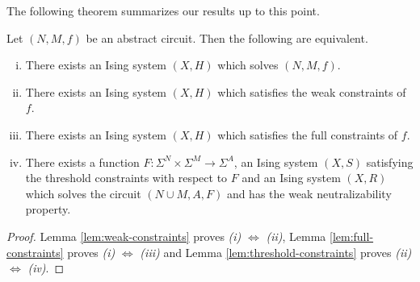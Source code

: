 \documentclass{article}
\begin{document}
\bigskip

The following theorem summarizes our results up to this point.
\begin{thm}\label{thm:ising-solve-equivalences}
  Let $(N, M, f)$ be an abstract circuit. Then the following are equivalent.
  \begin{enumerate}[(i)]
    \item There exists an Ising system $(X, H)$ which solves $(N,M,f)$.
    \item There exists an Ising system $(X,H)$ which satisfies the weak constraints of $f$.
    \item There exists an Ising system $(X,H)$ which satisfies the full constraints of $f$.
    \item There exists a function $F: \Sigma^N \times \Sigma^M\to \Sigma^A$, an Ising system $(X,S)$ satisfying the threshold constraints with respect to $F$ and an Ising system $(X, R)$ which solves the circuit $(N\cup M, A, F)$ and has the weak neutralizability property.
  \end{enumerate}
\end{thm}
\begin{proof}
  Lemma \ref{lem:weak-constraints} proves \emph{(i)} $\Leftrightarrow$ \emph{(ii)}, Lemma \ref{lem:full-constraints} proves \emph{(i)} $\Leftrightarrow$ \emph{(iii)} and Lemma \ref{lem:threshold-constraints} proves \emph{(ii)} $\Leftrightarrow$ \emph{(iv)}.
\end{proof}
\end{document}
